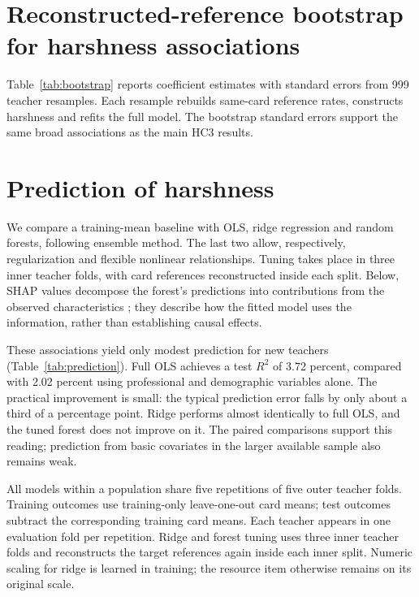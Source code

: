 \color{reused}
\section{Reconstructed-reference bootstrap for harshness associations}
Table~\ref{tab:bootstrap} reports coefficient estimates with standard errors from 999 teacher resamples. Each resample rebuilds same-card reference rates, constructs harshness and refits the full model. The bootstrap standard errors support the same broad associations as the main HC3 results.

\section{Prediction of harshness}
We compare a training-mean baseline with OLS, ridge regression and random forests, following \citet{rf} ensemble method. The last two allow, respectively, regularization and flexible nonlinear relationships. Tuning takes place in three inner teacher folds, with card references reconstructed inside each split. Below, SHAP values decompose the forest’s predictions into contributions from the observed characteristics \citep{shap}; they describe how the fitted model uses the information, rather than establishing causal effects. 

These associations yield only modest prediction for new teachers (Table~\ref{tab:prediction}). Full OLS achieves a test $R^2$ of 3.72 percent, compared with 2.02 percent using professional and demographic variables alone. The practical improvement is small: the typical prediction error falls by only about a third of a percentage point. Ridge performs almost identically to full OLS, and the tuned forest does not improve on it. The paired comparisons support this reading; prediction from basic covariates in the larger available sample also remains weak.


All models within a population share five repetitions of five outer teacher folds. Training outcomes use training-only leave-one-out card means; test outcomes subtract the corresponding training card means. Each teacher appears in one evaluation fold per repetition. Ridge and forest tuning uses three inner teacher folds and reconstructs the target references again inside each inner split. Numeric scaling for ridge is learned in training; the resource item otherwise remains on its original scale.

